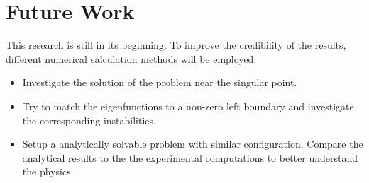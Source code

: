 \chapter{Future Work}
This research is still in its beginning. To improve the credibility of the results, different numerical calculation methods will be employed.

\begin{itemize}
    \item Investigate the solution of the problem near the singular point. 
    \item Try to match the eigenfunctions to a non-zero left boundary and investigate the corresponding instabilities.
    \item Setup a analytically solvable problem with similar configuration. Compare the analytical results to the the experimental computations to better understand the physics.
\end{itemize}